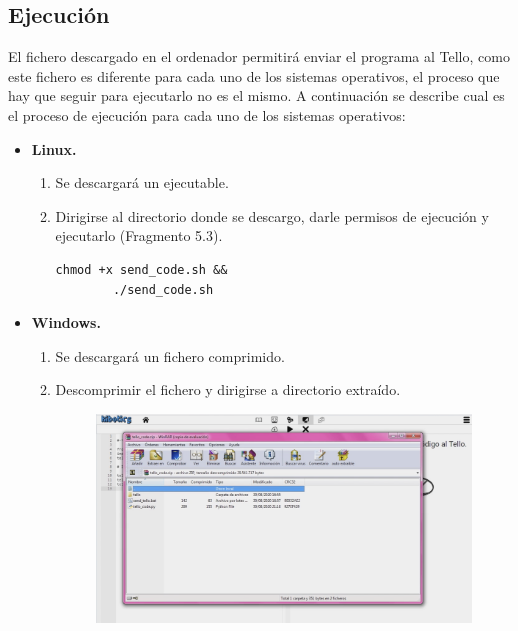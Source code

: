 \documentclass{report}
\begin{document}
\subsection{Ejecución}


El fichero descargado en el ordenador permitirá enviar el programa al Tello, como este fichero es diferente para cada uno de los sistemas operativos, el proceso que hay que seguir para ejecutarlo no es el mismo. A continuación se describe cual es el proceso de ejecución para cada uno de los sistemas operativos:
\begin{itemize}
	\item \textbf{Linux.} 
		\begin{enumerate}
			\item Se descargará un ejecutable.
			\item Dirigirse al directorio donde se descargo, darle permisos de ejecución y ejecutarlo (Fragmento 5.3).
			\\
			\begin{lstlisting}[frame=single,breaklines=true, label=Comandos para ejecución del envío en MacOs, caption=Comandos para ejecución del envío en MacOs,  captionpos=b]
		chmod +x send_code.sh &&
		./send_code.sh
			\end{lstlisting}
		\end{enumerate}
	\item \textbf{Windows.} 
		\begin{enumerate}
			\item Se descargará un fichero comprimido.
			\item Descomprimir el fichero y dirigirse a  directorio extraído.
			\\
			\begin{figure}[h!]
 			 	\centering
    				\includegraphics[width=1\textwidth]{images/descarga_windows_tello.png}

\end{figure}
\end{enumerate}
\end{itemize}
\end{document}
